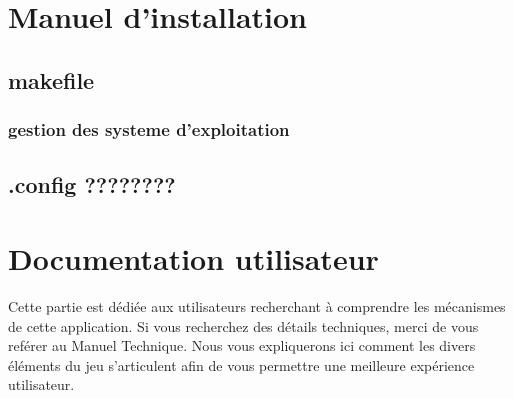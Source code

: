 \documentclass[a4paper 12pts]{article}
\begin{document}
\newpage

\section{Manuel d'installation}

\vspace{1.5cm}


\subsection{makefile}



\subsubsection{gestion des systeme d'exploitation}

\subsection{.config ????????}


\newpage

\section{Documentation utilisateur}


\vspace{2cm}

Cette partie est dédiée aux utilisateurs recherchant à comprendre les mécanismes de cette application.
Si vous recherchez des détails techniques, merci de vous reférer au Manuel Technique.
Nous vous expliquerons ici comment les divers éléments du jeu s'articulent afin de vous permettre une meilleure expérience utilisateur.

\vspace{0.5cm}	
\end{document}
